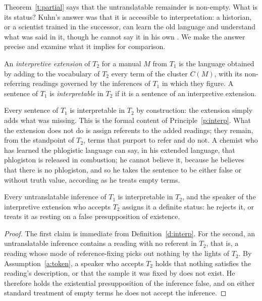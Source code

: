 \documentclass{situationist-preprint}
\begin{document}
Theorem~\ref{t:partial} says that the untranslatable remainder is non-empty. What is its status? Kuhn's answer was that it is accessible to interpretation: a historian, or a scientist trained in the successor, can learn the old language and understand what was said in it, though he cannot say it in his own \citep{Kuhn1983}. We make the answer precise and examine what it implies for comparison.

\begin{definition}\label{d:interp}
An \emph{interpretive extension} of $T_2$ for a manual $M$ from $T_1$ is the language obtained by adding to the vocabulary of $T_2$ every term of the cluster $C(M)$, with its non-referring readings governed by the inferences of $T_1$ in which they figure. A sentence of $T_1$ is \emph{interpretable} in $T_2$ if it is a sentence of an interpretive extension.
\end{definition}

Every sentence of $T_1$ is interpretable in $T_2$ by construction: the extension simply adds what was missing. This is the formal content of Principle~\ref{p:interp}. What the extension does not do is assign referents to the added readings; they remain, from the standpoint of $T_2$, terms that purport to refer and do not. A chemist who has learned the phlogistic language can say, in his extended language, that phlogiston is released in combustion; he cannot believe it, because he believes that there is no phlogiston, and so he takes the sentence to be either false or without truth value, according as he treats empty terms.

\begin{proposition}\label{p:assess}
Every untranslatable inference of $T_1$ is interpretable in $T_2$, and the speaker of the interpretive extension who accepts $T_2$ assigns it a definite status: he rejects it, or treats it as resting on a false presupposition of existence.
\end{proposition}

\begin{proof}
The first claim is immediate from Definition~\ref{d:interp}. For the second, an untranslatable inference contains a reading with no referent in $T_2$, that is, a reading whose mode of reference-fixing picks out nothing by the lights of $T_2$. By Assumption~\ref{a:token}, a speaker who accepts $T_2$ holds that nothing satisfies the reading's description, or that the sample it was fixed by does not exist. He therefore holds the existential presupposition of the inference false, and on either standard treatment of empty terms he does not accept the inference.
\end{proof}
\end{document}
